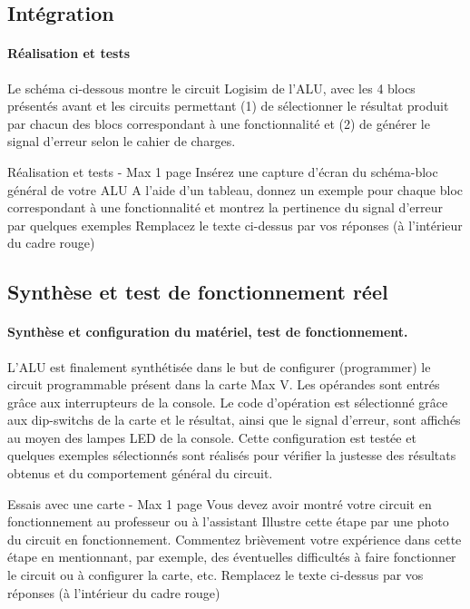 \documentclass[a4paper]{article}
\begin{document}
\subsection{Intégration}
\paragraph{Réalisation et tests}
Le schéma ci-dessous montre le circuit Logisim de l’ALU, avec les 4 blocs présentés avant et les circuits permettant (1) de sélectionner le résultat produit par chacun des blocs correspondant à une fonctionnalité et (2) de générer le signal d’erreur selon le cahier de charges. 

\begin{tcolorbox}[colframe=Monokaimagenta,colback=white]
Réalisation et tests - Max 1 page 
Insérez une capture d’écran du schéma-bloc général de votre ALU
A l’aide d’un tableau, donnez un exemple pour chaque bloc correspondant à une fonctionnalité et montrez la pertinence du signal d’erreur par quelques exemples
Remplacez le texte ci-dessus par vos réponses (à l’intérieur du cadre rouge)
\end{tcolorbox}

\subsection{Synthèse et test de fonctionnement réel}
\paragraph{Synthèse et configuration du matériel, test de fonctionnement.}
L’ALU est finalement synthétisée dans le but de configurer (programmer) le circuit programmable présent dans la carte Max V. Les opérandes sont entrés grâce aux interrupteurs de la console. Le code d’opération est sélectionné grâce aux dip-switchs de la carte et le résultat, ainsi que le signal d’erreur, sont affichés au moyen des lampes LED de la console. Cette configuration est testée et quelques exemples sélectionnés sont réalisés pour vérifier la justesse des résultats obtenus et du comportement général du circuit.

\begin{tcolorbox}[colframe=Monokaimagenta,colback=white]
Essais avec une carte - Max 1 page 
Vous devez avoir montré votre circuit en fonctionnement au professeur ou à l’assistant
Illustre cette étape par une photo du circuit en fonctionnement.
Commentez brièvement votre expérience dans cette étape en mentionnant, par exemple, des éventuelles difficultés à faire fonctionner le circuit ou à configurer la carte, etc.
Remplacez le texte ci-dessus par vos réponses (à l’intérieur du cadre rouge)
\end{tcolorbox}
\end{document}
